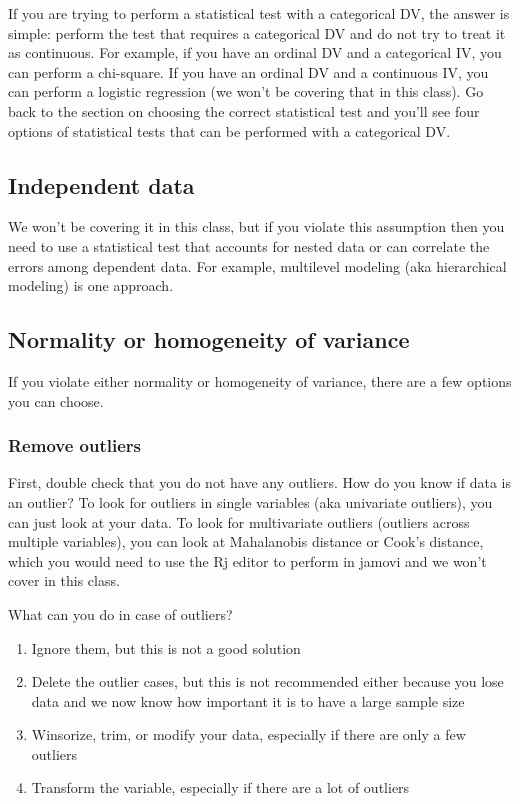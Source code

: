 \documentclass[
]{book}
\providecommand{\tightlist}{%
  \setlength{\itemsep}{0pt}\setlength{\parskip}{0pt}}
\begin{document}
If you are trying to perform a statistical test with a categorical DV, the answer is simple: perform the test that requires a categorical DV and do not try to treat it as continuous. For example, if you have an ordinal DV and a categorical IV, you can perform a chi-square. If you have an ordinal DV and a continuous IV, you can perform a logistic regression (we won't be covering that in this class). Go back to the section on choosing the correct statistical test and you'll see four options of statistical tests that can be performed with a categorical DV.

\hypertarget{independent-data}{%
\subsection{Independent data}\label{independent-data}}

We won't be covering it in this class, but if you violate this assumption then you need to use a statistical test that accounts for nested data or can correlate the errors among dependent data. For example, multilevel modeling (aka hierarchical modeling) is one approach.

\hypertarget{normality-or-homogeneity-of-variance}{%
\subsection{Normality or homogeneity of variance}\label{normality-or-homogeneity-of-variance}}

If you violate either normality or homogeneity of variance, there are a few options you can choose.

\hypertarget{remove-outliers}{%
\subsubsection{Remove outliers}\label{remove-outliers}}

First, double check that you do not have any outliers. How do you know if data is an outlier? To look for outliers in single variables (aka univariate outliers), you can just look at your data. To look for multivariate outliers (outliers across multiple variables), you can look at Mahalanobis distance or Cook's distance, which you would need to use the Rj editor to perform in jamovi and we won't cover in this class.

What can you do in case of outliers?

\begin{enumerate}
\def\labelenumi{\arabic{enumi}.}
\tightlist
\item
  Ignore them, but this is not a good solution
\item
  Delete the outlier cases, but this is not recommended either because you lose data and we now know how important it is to have a large sample size
\item
  Winsorize, trim, or modify your data, especially if there are only a few outliers
\item
  Transform the variable, especially if there are a lot of outliers
\end{enumerate}
\end{document}
